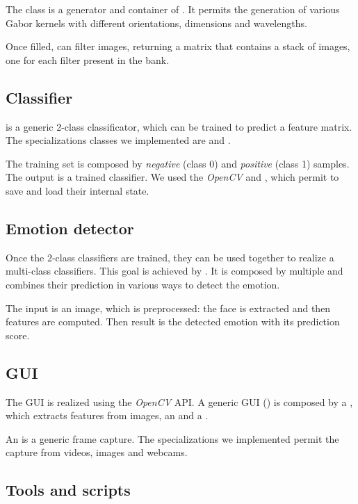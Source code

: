 The class  is a generator and container of .
It permits the generation of various Gabor kernels with different orientations,
dimensions and wavelengths.

Once filled,  can filter images, returning a matrix that
contains a stack of images, one for each filter present in the bank.

\subsection{Classifier}

 is a generic 2-class classificator, which can be trained to
predict a feature matrix. The specializations classes we implemented are
 and .

The training set is composed by \emph{negative} (class 0) and \emph{positive}
(class 1) samples. The output is a trained classifier. We used the
\emph{OpenCV}  and , which permit to save and load
their internal state.

\subsection{Emotion detector}

Once the 2-class classifiers are trained, they can be used together to realize
a multi-class classifiers. This goal is achieved by . It is
composed by multiple  and combines their prediction in various
ways to detect the emotion.

The input is an image, which is preprocessed: the face is extracted and then
features are computed. Then result is the detected emotion with its prediction
score.

\subsection{GUI}

The GUI is realized using the \emph{OpenCV} API. A generic GUI () is
composed by a , which extracts features from images, an
 and a .

An  is a generic frame capture. The specializations we
implemented permit the capture from videos, images and webcams.

\subsection{Tools and scripts}

